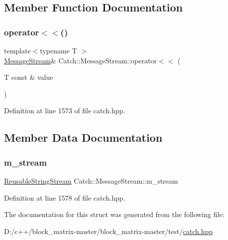\subsection{Member Function Documentation}
\mbox{\label{struct_catch_1_1_message_stream_a554c4aff5925a077e9fe9d858217428d}} 
\subsubsection{\texorpdfstring{operator$<$$<$()}{operator<<()}}
{\footnotesize\ttfamily template$<$typename T $>$ \\
\mbox{\hyperlink{struct_catch_1_1_message_stream}{Message\+Stream}}\& Catch\+::\+Message\+Stream\+::operator$<$$<$ (\begin{DoxyParamCaption}\item[{T const \&}]{value }\end{DoxyParamCaption})\hspace{0.3cm}{\ttfamily [inline]}}



Definition at line 1573 of file catch.\+hpp.



\subsection{Member Data Documentation}
\mbox{\label{struct_catch_1_1_message_stream_a9202520faed8882ef469db9f353ec578}} 
\subsubsection{\texorpdfstring{m\+\_\+stream}{m\_stream}}
{\footnotesize\ttfamily \mbox{\hyperlink{class_catch_1_1_reusable_string_stream}{Reusable\+String\+Stream}} Catch\+::\+Message\+Stream\+::m\+\_\+stream}



Definition at line 1578 of file catch.\+hpp.



The documentation for this struct was generated from the following file\+:\begin{DoxyCompactItemize}
\item 
D\+:/c++/block\+\_\+matrix-\/master/block\+\_\+matrix-\/master/test/\mbox{\hyperlink{catch_8hpp}{catch.\+hpp}}\end{DoxyCompactItemize}
